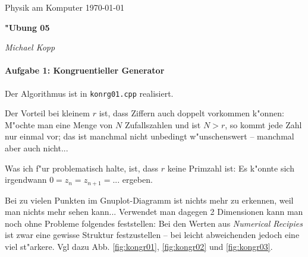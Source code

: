 \documentclass[a4paper,12pt]{article}
\begin{document}
\newcommand{\NAME}{Michael Kopp}
\newcommand{\FACH}{Physik am Komputer}
\newcommand{\TITEL}{"Ubung 05}
\newcommand{\DATUM}{\today}


\pagestyle{plain} 




\sloppy

\begin{center}
\FACH
\hfill
\DATUM
\end{center}

\vspace{-5mm} %

\begin{center}
  \begin{Large}
 \textbf{\TITEL}
  \end{Large}
\end{center}

\vspace{-3mm}

\begin{center}
\hrulefill
\quad 
\textit{\NAME}
\,
\hrulefill
\end{center}
 
 

\noindent

\paragraph{Aufgabe 1: Kongruentieller Generator}
\label{sec:aufg_1:_kongr_gener}

Der Algorithmus ist in \texttt{konrg01.cpp} realisiert.

Der Vorteil bei kleinem $r$ ist, dass Ziffern auch doppelt vorkommen
k"onnen: M"ochte man eine Menge von $N$ Zufallszahlen und ist $N>r$,
so kommt jede Zahl nur einmal vor; das ist manchmal nicht unbedingt
w"unschenswert -- manchmal aber auch nicht...

Was ich f"ur problematisch halte, ist, dass $r$ keine Primzahl ist: Es
k"onnte sich irgendwann $0 = z_n = z_{n+1} = ...$ ergeben.

Bei zu vielen Punkten im Gnuplot-Diagramm ist nichts mehr zu erkennen,
weil man nichts mehr sehen kann... Verwendet man dagegen 2 Dimensionen
kann man noch ohne Probleme folgendes feststellen: Bei den Werten aus
\textit{Numerical Recipies} ist zwar eine gewisse Struktur
festzustellen -- bei leicht abweichenden jedoch eine viel
st"arkere. Vgl dazu Abb. \ref{fig:kongr01}, \ref{fig:kongr02} und \ref{fig:kongr03}.
\end{document}
